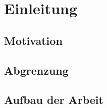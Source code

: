\chapter{Einleitung}\label{ch:einleitung}

\section{Motivation}\label{sec:motivation}

\section{Abgrenzung}\label{sec:abgrenzung}

\section{Aufbau der Arbeit}\label{sec:aufbau-der-arbeit}
